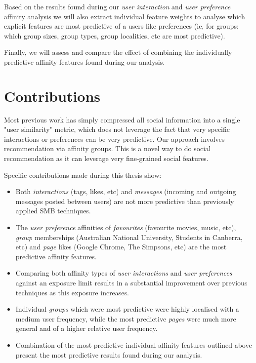 Based on the results found during our \emph{user interaction} and \emph{user preference} affinity analysis we will also extract individual feature 
weights to analyse which explicit features are most predictive of a users like preferences 
(ie, for groups: which group sizes, group types, group localities, etc are most predictive).

Finally, we will assess and compare the effect of combining the individually predictive affinity features found during our analysis.

\section{Contributions}
\label{sec:contributions}

Most previous work has simply compressed all social information into a single "user similarity" metric, which does not leverage
the fact that very specific interactions or preferences can be very predictive. Our approach involves  
recommendation via affinity groups. This is a novel way to do social recommendation as it can leverage very fine-grained social features.

Specific contributions made during this thesis show:

\begin{itemize}
\item Both \emph{interactions} (tags, likes, etc) and \emph{messages} (incoming and outgoing messages posted between users) are not more predictive than 
previously applied SMB techniques.
\item The \emph{user preference} affinities of \emph{favourites} (favourite movies, music, etc), \emph{group} memberships (Australian National University, Students in Canberra, etc) 
and \emph{page} likes (Google Chrome, The Simpsons, etc) are the most predictive affinity features.
\item Comparing both affinity types of \emph{user interactions} and \emph{user preferences} against an exposure limit results in a 
substantial improvement over previous techniques as this exposure increases.
\item Individual \emph{groups} which were most predictive were highly localised with a medium user frequency, while the most predictive 
\emph{pages} were much more general and of a higher relative user frequency.
\item Combination of the most predictive individual affinity features outlined above present the most predictive results found during our analysis.
\end{itemize} 

